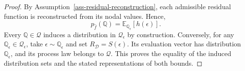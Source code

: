 \documentclass[review,11pt,3p,authoryear,nopreprintline]{elsarticle}
\begin{document}
\begin{proof}
  By Assumption~\ref{ass-residual-reconstruction}, each
  admissible residual function is reconstructed from its
  nodal values. Hence,
  \[
    p_{\hat{f}}(\mathbb{Q})
    =
    \mathbb{E}_{\mathbb{Q}_{\epsilon}}[h(\epsilon)].
  \]
  Every $\mathbb{Q}\in\mathscr{Q}$ induces a distribution
  in $\mathscr{Q}_{\epsilon}$ by construction.
  Conversely, for any
  $\mathbb{Q}_{\epsilon}\in\mathscr{Q}_{\epsilon}$,
  take $\epsilon\sim\mathbb{Q}_{\epsilon}$ and set
  $R_{\mathcal{D}}=S(\epsilon)$.
  Its evaluation vector has distribution
  $\mathbb{Q}_{\epsilon}$, and its process law belongs
  to $\mathscr{Q}$.
  This proves the equality of the induced distribution
  sets and the stated representations of both bounds.
\end{proof}





\end{document}
